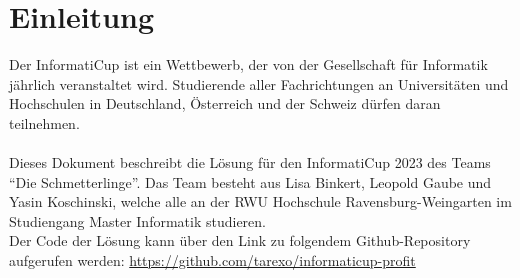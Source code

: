 \section{Einleitung}
\setcounter{page}{0}
Der InformatiCup ist ein Wettbewerb, der von der Gesellschaft für Informatik jährlich veranstaltet wird. Studierende aller Fachrichtungen an Universitäten und Hochschulen in Deutschland, Österreich und der Schweiz dürfen daran teilnehmen.
\\\\
Dieses Dokument beschreibt die Lösung für den InformatiCup 2023 des Teams “Die Schmetterlinge”. Das Team besteht aus Lisa Binkert, Leopold Gaube und Yasin Koschinski, welche alle an der RWU Hochschule Ravensburg-Weingarten im Studiengang Master Informatik studieren.
\\


Der Code der Lösung kann über den Link zu folgendem Github-Repository aufgerufen werden: \url{https://github.com/tarexo/informaticup-profit} 

